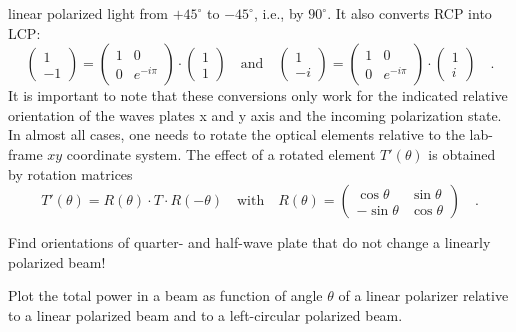 linear polarized light from $+45^\circ $ to $-45^\circ $, i.e., by $90^\circ$. It also converts RCP into LCP:
\begin{equation}
            \begin{pmatrix}
                1 \\ -1
             \end{pmatrix}
             = 
            \begin{pmatrix}
                1 & 0 \\ 0 & e^{-i \pi}
                 \end{pmatrix} \cdot
                 \begin{pmatrix}
                    1 \\ 1
                 \end{pmatrix}
                 \quad \text{and} \quad
                 \begin{pmatrix}
                    1 \\ -i
                 \end{pmatrix}
                 = 
                \begin{pmatrix}
                    1 & 0 \\ 0 & e^{-i \pi}
                     \end{pmatrix} \cdot
                     \begin{pmatrix}
                        1 \\ i
                     \end{pmatrix} \quad .
\end{equation}
It is important to note that these conversions only work for the indicated relative orientation of the waves plates x and y axis and the incoming polarization state. In almost all cases, one needs to rotate the  optical elements relative to the lab-frame $xy$ coordinate system. The effect of a rotated element $T'(\theta)$ is obtained by rotation matrices
\begin{equation}
    T'(\theta) = R(\theta) \cdot T \cdot R(-\theta) \quad \text{with} \quad
    R(\theta) = 
    \begin{pmatrix}
        \cos \theta & \sin \theta \\ 
        - \sin \theta & \cos \theta 
    \end{pmatrix} \quad .
\end{equation}

\begin{questions}
    \item Find orientations of quarter- and half-wave plate that do not change a linearly polarized beam!
    \item Plot the total power in a beam as function of angle $\theta$ of a linear polarizer relative to a linear polarized beam and to a left-circular polarized beam.
\end{questions}


